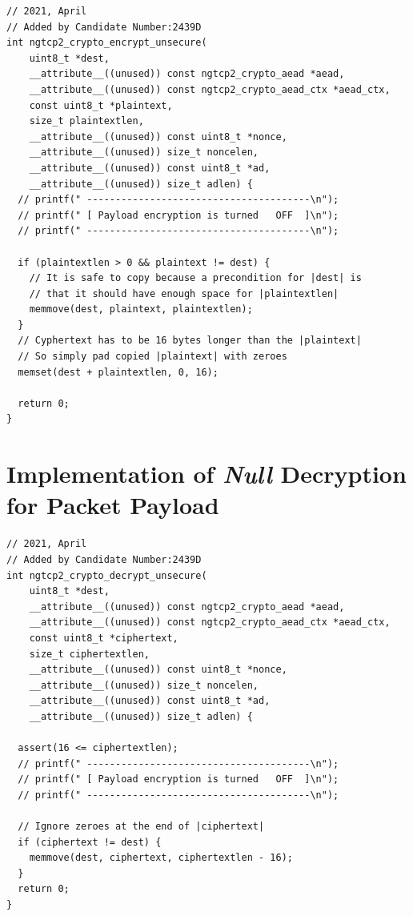 \documentclass[12pt,a4paper]{report}
\begin{document}
\begin{verbatim}
// 2021, April
// Added by Candidate Number:2439D
int ngtcp2_crypto_encrypt_unsecure(
    uint8_t *dest, 
    __attribute__((unused)) const ngtcp2_crypto_aead *aead,
    __attribute__((unused)) const ngtcp2_crypto_aead_ctx *aead_ctx,
    const uint8_t *plaintext, 
    size_t plaintextlen,
    __attribute__((unused)) const uint8_t *nonce, 
    __attribute__((unused)) size_t noncelen,
    __attribute__((unused)) const uint8_t *ad, 
    __attribute__((unused)) size_t adlen) {
  // printf(" ---------------------------------------\n");
  // printf(" [ Payload encryption is turned   OFF  ]\n");
  // printf(" ---------------------------------------\n");

  if (plaintextlen > 0 && plaintext != dest) {
    // It is safe to copy because a precondition for |dest| is 
    // that it should have enough space for |plaintextlen|
    memmove(dest, plaintext, plaintextlen);
  }
  // Cyphertext has to be 16 bytes longer than the |plaintext|
  // So simply pad copied |plaintext| with zeroes
  memset(dest + plaintextlen, 0, 16);

  return 0;
}
\end{verbatim}

\section{Implementation of \textit{Null} Decryption for Packet Payload}
\label{Implementation_of_Null_Decryption_packet_payload}

\begin{verbatim}
// 2021, April
// Added by Candidate Number:2439D
int ngtcp2_crypto_decrypt_unsecure(
    uint8_t *dest, 
    __attribute__((unused)) const ngtcp2_crypto_aead *aead,
    __attribute__((unused)) const ngtcp2_crypto_aead_ctx *aead_ctx,
    const uint8_t *ciphertext, 
    size_t ciphertextlen,
    __attribute__((unused)) const uint8_t *nonce, 
    __attribute__((unused)) size_t noncelen,
    __attribute__((unused)) const uint8_t *ad, 
    __attribute__((unused)) size_t adlen) {

  assert(16 <= ciphertextlen);
  // printf(" ---------------------------------------\n");
  // printf(" [ Payload encryption is turned   OFF  ]\n");
  // printf(" ---------------------------------------\n");

  // Ignore zeroes at the end of |ciphertext|
  if (ciphertext != dest) {
    memmove(dest, ciphertext, ciphertextlen - 16);
  }
  return 0;
}
\end{verbatim}
\end{document}
